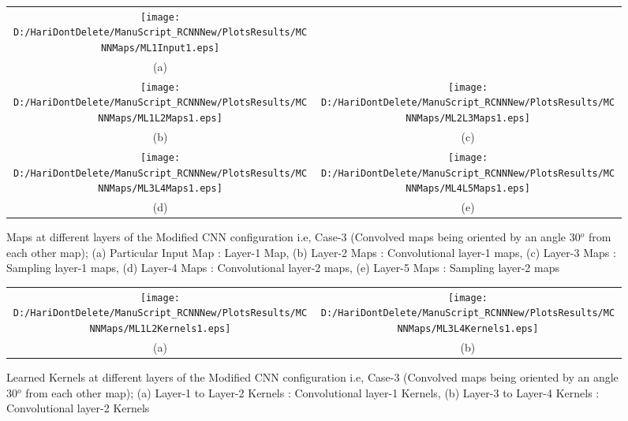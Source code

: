 \begin{figure*}
\begin{tabular}{cc}
\texttt{[image: D:/HariDontDelete/ManuScript\_RCNNNew/PlotsResults/MCNNMaps/ML1Input1.eps]}\\
(a)\\
\texttt{[image: D:/HariDontDelete/ManuScript\_RCNNNew/PlotsResults/MCNNMaps/ML1L2Maps1.eps]}&\texttt{[image: D:/HariDontDelete/ManuScript\_RCNNNew/PlotsResults/MCNNMaps/ML2L3Maps1.eps]}\\
(b)  & (c) \\
\texttt{[image: D:/HariDontDelete/ManuScript\_RCNNNew/PlotsResults/MCNNMaps/ML3L4Maps1.eps]}&\texttt{[image: D:/HariDontDelete/ManuScript\_RCNNNew/PlotsResults/MCNNMaps/ML4L5Maps1.eps]}\\
(d)  & (e) \\
\end{tabular}
\caption{ Maps at different layers of the Modified CNN configuration i.e, Case-3 (Convolved maps being oriented by an angle 30$^o$ from each other map); (a) Particular Input Map : Layer-1 Map, (b) Layer-2 Maps : Convolutional layer-1 maps, (c) Layer-3 Maps : Sampling layer-1 maps, (d) Layer-4 Maps : Convolutional layer-2 maps, (e) Layer-5 Maps : Sampling layer-2 maps}
\label{FIG:ML1L2L3L4L5Maps}
\end{figure*}

\begin{figure*}
\begin{tabular}{cc}
\texttt{[image: D:/HariDontDelete/ManuScript\_RCNNNew/PlotsResults/MCNNMaps/ML1L2Kernels1.eps]}&\texttt{[image: D:/HariDontDelete/ManuScript\_RCNNNew/PlotsResults/MCNNMaps/ML3L4Kernels1.eps]}\\
(a)  & (b) \\
\end{tabular}
\caption{ Learned Kernels at different layers of the Modified CNN configuration i.e, Case-3 (Convolved maps being oriented by an angle 30$^o$ from each other map); (a) Layer-1 to Layer-2 Kernels : Convolutional layer-1 Kernels, (b) Layer-3 to Layer-4 Kernels : Convolutional layer-2 Kernels}
\label{FIG:MConvKernels}
\end{figure*}


